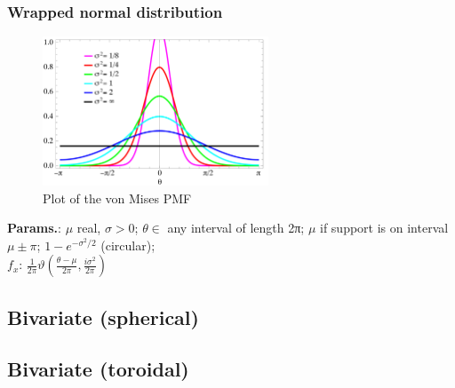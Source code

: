     
        
\subsubsection{Wrapped normal distribution}


    \begin{figure}[H]
        \centering
        \includegraphics[width=0.6\textwidth]{images/WrappedNormalPDF.png}
        \caption{Plot of the von Mises PMF}
    \end{figure}




    {\color{darkblue} \textbf{Params.}:} {$\mu$ real,  $\sigma>0$}; {$\theta \in$ any interval of length 2π}; {$\mu$ if support is on interval $\mu\pm \pi$}; {$1-e^{-\sigma^2/2}$ (circular)};\hspace{0.5cm}\\{\color{darkblue} \textbf{$f_x$}:} {$\frac{1}{2\pi}\vartheta\left(\frac{\theta-\mu}{2\pi},\frac{i\sigma^2}{2\pi}\right)$}



    

        
            \subsection{Bivariate (spherical)}

            
    

        
            \subsection{Bivariate (toroidal)}

